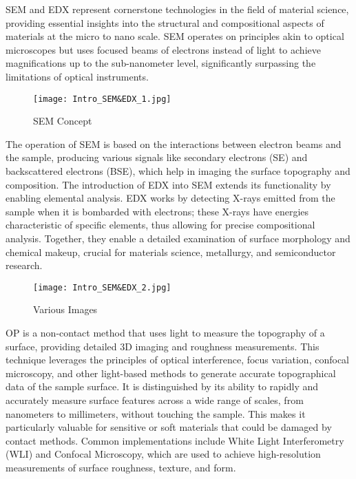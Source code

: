 \documentclass[11pt]{article}
\begin{document}
	SEM and EDX represent cornerstone technologies in the field of material science, providing essential insights into the structural and compositional aspects of materials at the micro to nano scale. SEM operates on principles akin to optical microscopes but uses focused beams of electrons instead of light to achieve magnifications up to the sub-nanometer level, significantly surpassing the limitations of optical instruments.
	
	\begin{figure}[htbp]
		\centering
		\texttt{[image: Intro\_SEM\&EDX\_1.jpg]}
		\caption{SEM Concept}
	\end{figure}
	
	The operation of SEM is based on the interactions between electron beams and the sample, producing various signals like secondary electrons (SE) and backscattered electrons (BSE), which help in imaging the surface topography and composition. The introduction of EDX into SEM extends its functionality by enabling elemental analysis. EDX works by detecting X-rays emitted from the sample when it is bombarded with electrons; these X-rays have energies characteristic of specific elements, thus allowing for precise compositional analysis. Together, they enable a detailed examination of surface morphology and chemical makeup, crucial for materials science, metallurgy, and semiconductor research.
	
	\begin{figure}[htbp]
		\centering
		\texttt{[image: Intro\_SEM\&EDX\_2.jpg]}
		\caption{Various Images}
	\end{figure}
	
\clearpage
	
	OP is a non-contact method that uses light to measure the topography of a surface, providing detailed 3D imaging and roughness measurements. This technique leverages the principles of optical interference, focus variation, confocal microscopy, and other light-based methods to generate accurate topographical data of the sample surface. It is distinguished by its ability to rapidly and accurately measure surface features across a wide range of scales, from nanometers to millimeters, without touching the sample. This makes it particularly valuable for sensitive or soft materials that could be damaged by contact methods. Common implementations include White Light Interferometry (WLI) and Confocal Microscopy, which are used to achieve high-resolution measurements of surface roughness, texture, and form.
	
\end{document}
